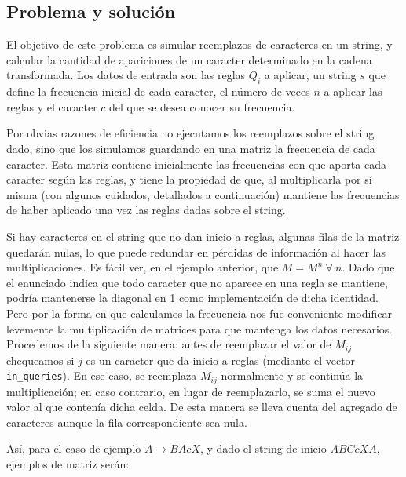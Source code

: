 \subsection*{Problema y solución}

El objetivo de este problema es simular reemplazos de caracteres en un
string, y calcular la cantidad de apariciones de un caracter determinado
en la cadena transformada. Los datos de entrada son las reglas $Q_i$ a aplicar,
un string $s$ que define la frecuencia inicial de cada caracter, el número de
veces $n$ a aplicar las reglas y el caracter $c$ del que se desea conocer su
frecuencia.

Por obvias razones de eficiencia no ejecutamos los reemplazos sobre el
string dado, sino que los simulamos guardando en una matriz la frecuencia
de cada caracter. Esta matriz contiene inicialmente las frecuencias con
que aporta cada caracter según las reglas, y tiene la propiedad de que,
al multiplicarla por sí misma (con algunos cuidados, detallados a
continuación) mantiene las frecuencias de haber aplicado una vez las
reglas dadas sobre el string.

Si hay caracteres en el string que no dan inicio a reglas, algunas filas de
la matriz quedarán nulas, lo que puede redundar en pérdidas de información al
hacer las multiplicaciones. Es fácil ver, en el ejemplo anterior, que $M=M^n\
\forall\ n$. Dado que el enunciado indica que todo caracter que no aparece en
una regla se mantiene, podría mantenerse la diagonal en 1 como implementación
de dicha identidad. Pero por la forma en que calculamos la frecuencia nos fue
conveniente modificar levemente la multiplicación de matrices para que
mantenga los datos necesarios. Procedemos de la siguiente manera: antes de
reemplazar el valor de $M_{ij}$ chequeamos si $j$ es un caracter que da
inicio a reglas (mediante el vector {\tt in\_queries}). En ese caso, se
reemplaza $M_{ij}$ normalmente y se continúa la multiplicación; en caso
contrario, en lugar de reemplazarlo, se suma el nuevo valor al que contenía
dicha celda. De esta manera se lleva cuenta del agregado de caracteres aunque
la fila correspondiente sea nula.

Así, para el caso de ejemplo $A \rightarrow BAcX$, y dado el string de inicio
$ABCcXA$, ejemplos de matriz serán:

